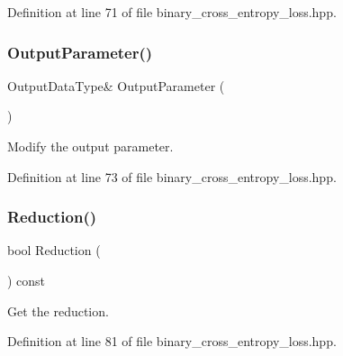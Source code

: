 Definition at line 71 of file binary\+\_\+cross\+\_\+entropy\+\_\+loss.\+hpp.

\mbox{\label{classmlpack_1_1ann_1_1BCELoss_a21d5f745f02c709625a4ee0907f004a5}} 
\subsubsection{Output\+Parameter()\hspace{0.1cm}{\footnotesize\ttfamily [2/2]}}
{\footnotesize\ttfamily Output\+Data\+Type\& Output\+Parameter (\begin{DoxyParamCaption}{ }\end{DoxyParamCaption})\hspace{0.3cm}{\ttfamily [inline]}}



Modify the output parameter. 



Definition at line 73 of file binary\+\_\+cross\+\_\+entropy\+\_\+loss.\+hpp.

\mbox{\label{classmlpack_1_1ann_1_1BCELoss_afb1123035456ff8aa73e7f7c08e6acbc}} 
\subsubsection{Reduction()\hspace{0.1cm}{\footnotesize\ttfamily [1/2]}}
{\footnotesize\ttfamily bool Reduction (\begin{DoxyParamCaption}{ }\end{DoxyParamCaption}) const\hspace{0.3cm}{\ttfamily [inline]}}



Get the reduction. 



Definition at line 81 of file binary\+\_\+cross\+\_\+entropy\+\_\+loss.\+hpp.

\mbox{\label{classmlpack_1_1ann_1_1BCELoss_ace5e97393cf08c81177ad0929d1c3496}} 
